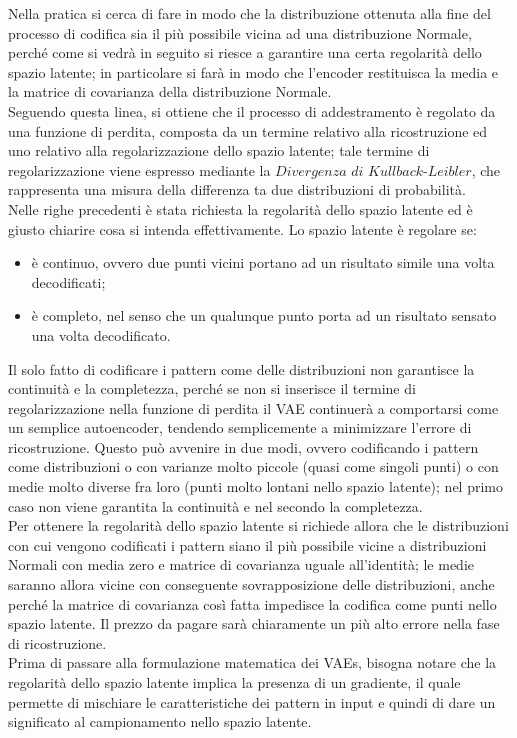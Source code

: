 Nella pratica si cerca di fare in modo che la distribuzione ottenuta alla fine del processo di codifica sia il più possibile vicina ad una distribuzione Normale, perché come si vedrà in seguito si riesce a garantire una certa regolarità dello spazio latente; in particolare si farà in modo che l'encoder restituisca la media e la matrice di covarianza della distribuzione Normale. \\ 
Seguendo questa linea, si ottiene che il processo di addestramento è regolato da una funzione di perdita, composta da un termine relativo alla ricostruzione ed uno relativo alla regolarizzazione dello spazio latente; tale termine di regolarizzazione viene espresso mediante la $\textit{Divergenza di Kullback-Leibler}$, che rappresenta una misura della differenza ta due distribuzioni di probabilità. \\
Nelle righe precedenti è stata richiesta la regolarità dello spazio latente ed è giusto chiarire cosa si intenda effettivamente. Lo spazio latente è regolare se:
\begin{itemize}
	\item è continuo, ovvero due punti vicini portano ad un risultato simile una volta decodificati;
	\item è completo, nel senso che un qualunque punto porta ad un risultato sensato una volta decodificato.  
\end{itemize}
Il solo fatto di codificare i pattern come delle distribuzioni non garantisce la continuità e la completezza, perché se non si inserisce il termine di regolarizzazione nella funzione di perdita il VAE continuerà a comportarsi come un semplice autoencoder, tendendo semplicemente a minimizzare l'errore di ricostruzione. Questo può avvenire in due modi, ovvero codificando i pattern come distribuzioni o con varianze molto piccole (quasi come singoli punti) o con medie molto diverse fra loro (punti molto lontani nello spazio latente); nel primo caso non viene garantita la continuità e nel secondo la completezza. \\ 
Per ottenere la regolarità dello spazio latente si richiede allora che le distribuzioni con cui vengono codificati i pattern siano il più possibile vicine a distribuzioni Normali con media zero e matrice di covarianza uguale all'identità; le medie saranno allora vicine con conseguente sovrapposizione delle distribuzioni, anche perché la matrice di covarianza così fatta impedisce la codifica come punti nello spazio latente. Il prezzo da pagare sarà chiaramente un più alto errore nella fase di ricostruzione.\\ 
Prima di passare alla formulazione matematica dei VAEs, bisogna notare che la regolarità dello spazio latente implica la presenza di un gradiente, il quale permette di mischiare le caratteristiche dei pattern in input e quindi di dare un significato al campionamento nello spazio latente. \\
